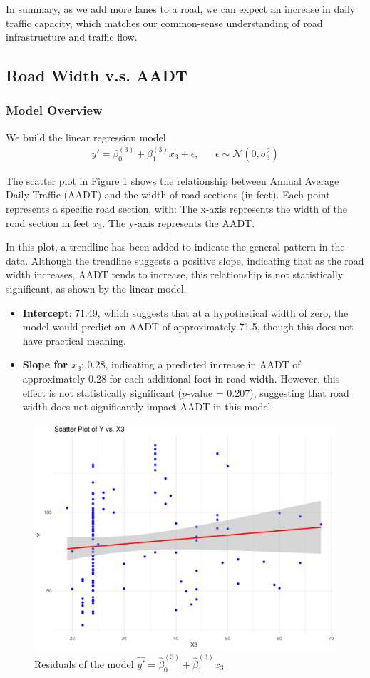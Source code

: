 In summary, as we add more lanes to a road, we can expect an increase in daily traffic capacity, which matches our common-sense understanding of road infrastructure and traffic flow.

\subsection{Road Width v.s. AADT}
\subsubsection{Model Overview}

We build the linear regression model
\begin{equation}
\begin{aligned}
y' = \beta_0^{(3)} + \beta_1^{(3)} x_3 + \epsilon, && \epsilon\sim\mathcal{N}(0, \sigma_3^2)
\end{aligned}
\end{equation}

The scatter plot in Figure \ref{fig:x3_scatter} shows the relationship between Annual Average Daily Traffic (AADT) and the width of road sections (in feet). Each point represents a specific road section, with:
The x-axis represents the width of the road section in feet \(x_3\).
The y-axis represents the AADT.

In this plot, a trendline has been added to indicate the general pattern in the data. Although the trendline suggests a positive slope, indicating that as the road width increases, AADT tends to increase, this relationship is not statistically significant, as shown by the linear model. 


\begin{itemize}

\item \textbf{Intercept}: 71.49, which suggests that at a hypothetical width of zero, the model would predict an AADT of approximately 71.5, though this does not have practical meaning.

\item \textbf{Slope for \(x_3\)}: 0.28, indicating a predicted increase in AADT of approximately 0.28 for each additional foot in road width. However, this effect is not statistically significant ($p$-value = 0.207), suggesting that road width does not significantly impact AADT in this model.
\end{itemize}

\begin{figure}
    \centering
    \includegraphics[width=0.5\linewidth]{figures/x3/scatter_plot}
    \caption{Residuals of the model $\hat{y'} = \hat{\beta}_0^{(3)} +\hat{\beta}_1^{(3)} x_3$}
    \label{fig:x3_scatter}
\end{figure}

